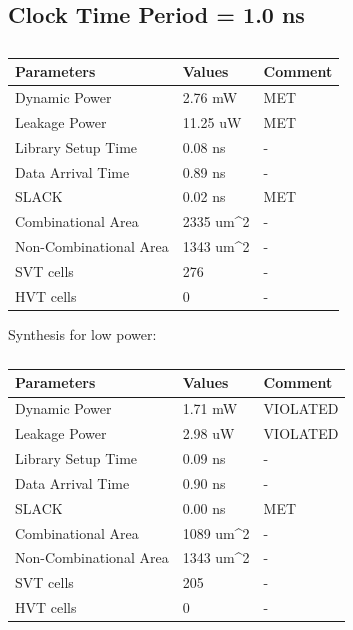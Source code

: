 \documentclass[11pt,a4paper]{article}
\begin{document}
\newpage
\subsection{Clock Time Period = 1.0 ns}
\begin{table}[htbp]
\begin{center}
\begin{tabular}{|l|l|l|}
\hline
\textbf{Parameters}	& \textbf{Values}		& \textbf{Comment}\\ \hline
Dynamic Power				&	2.76 mW				& MET\\ \hline
Leakage Power 			&	11.25 uW			& MET\\ \hline
Library Setup Time  & 0.08 ns				& - \\ \hline
Data Arrival Time		& 0.89 ns				& - \\ \hline
SLACK								& 0.02 ns				& MET\\ \hline
Combinational Area	& 2335 um^2			& - \\ \hline
Non-Combinational Area	& 1343 um^2	& - \\ \hline
SVT cells						& 276						& - \\ \hline
HVT cells						& 0							& - \\ \hline
\end{tabular}
\end{center}
\caption{}
\label{tab:syn1.0.1}
\end{table}

Synthesis for low power:

\begin{table}[htbp]
\begin{center}
\begin{tabular}{|l|l|l|}
\hline
\textbf{Parameters}	& \textbf{Values}		& \textbf{Comment}\\ \hline
Dynamic Power				&	1.71 mW				& VIOLATED\\ \hline
Leakage Power 			&	2.98 uW				& VIOLATED\\ \hline
Library Setup Time  & 0.09 ns				& - \\ \hline
Data Arrival Time		& 0.90 ns				& - \\ \hline
SLACK								& 0.00 ns				& MET\\ \hline
Combinational Area	& 1089 um^2			& - \\ \hline
Non-Combinational Area	& 1343 um^2	& - \\ \hline
SVT cells						& 205						& - \\ \hline
HVT cells						& 0							& - \\ \hline
\end{tabular}
\end{center}
\caption{}
\label{tab:syn1.0.2}
\end{table}
\end{document}
